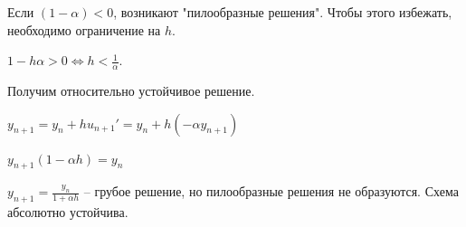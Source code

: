 \documentclass[a4paper,14pt]{article}
\begin{document}
\begin{figure}[!h]
	\label{fig:pr2}
\end{figure}

Если $(1 - \alpha) < 0$, возникают "пилообразные решения".
Чтобы этого избежать, необходимо ограничение на $h$.

$1 - h \alpha > 0 \Leftrightarrow h < \frac{1}{\alpha}.$ 

Получим относительно устойчивое решение.

\begin{figure}[!h]
	\label{fig:pr21}
\end{figure}

$y_{n + 1} = y_n + h u_{n+1}' = y_n + h (- \alpha y_{n+1})$

$y_{n + 1} (1 - \alpha h) = y_n$

$y_{n + 1} = \frac{y_n}{1 + \alpha h}$ -- грубое решение, но пилообразные решения
не образуются. Схема абсолютно устойчива.

\begin{figure}[!h]
	\label{fig:pr23}
\end{figure}
\end{document}
